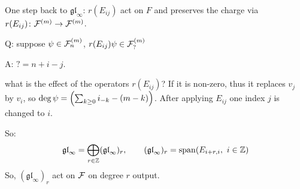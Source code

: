 \documentclass[]{../../../../tex/classes/styledArticle}
\newcommand\gl {\mathfrak{gl}}
\begin{document}
	One step back to $\gl_\infty$: $r(E_{ij})$ act on $F$ and preserves the charge via $r(E_{ij}) \colon \mathcal{F}^{(m)} \to \mathcal{F}^{(m)}$. 
	
	Q: suppose $\psi \in \mathcal{F}^{(m)}_n$, $r(E_{ij})\psi \in \mathcal{F}^{(m)}_? $
	
	A: $? = n + i -j$. 
	
	what is the effect of the operators $r(E_{ij})$? If it is non-zero, thus it replaces $v_j$ by $v_i$, so $\deg \psi = \left ( \sum_{k \ge 0} i_{-k} - (m - k) \right )$. After applying $E_{ij}$ one index $j$ is changed to $i$. 
	
	So: 
	\[ \gl_\infty = \bigoplus_{r \in \Z}(\gl_\infty)_r, \quad \quad (\gl_\infty)_r = \Sp(E_{i + r, i}, \ i \in \Z)  \]
	So, $(\gl_\infty)_r$ act on $\mathcal{F}$ on degree $r$ output. 
	
	
\end{document}
